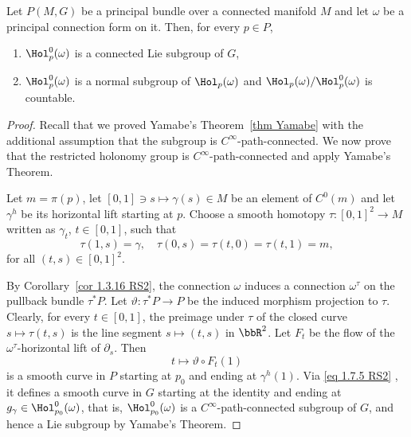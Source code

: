 \begin{thm}[{{\cite[Thm.~1.7.9]{RS2}}}]\label{thm 1.7.9 RS2}
    Let $P(M,G)$ be a principal bundle over a connected manifold $M$ and let $\omega$ be a principal connection form on it. Then, for every $p\in P$,
    \begin{enumerate}
        \item $\Hol_p^0(\omega)$ is a connected Lie subgroup of $G$,
        \item $\Hol_p^0(\omega)$ is a normal subgroup of $\Hol_p(\omega)$ and $\Hol_p(\omega)\slash \Hol_p^0(\omega)$ is countable.
    \end{enumerate}
\end{thm}
\begin{proof}
    Recall that we proved Yamabe's Theorem~\ref{thm Yamabe} with the additional assumption that the subgroup is $C^\infty$-path-connected. We now prove that the restricted holonomy group is $C^\infty$-path-connected and apply Yamabe's Theorem.

    Let $m=\pi(p)$, let $[0,1]\ni s\mapsto \gamma(s)\in M$ be an element of $C^0(m)$ and let $\gamma^h$ be its horizontal lift starting at $p$. Choose a smooth homotopy $\tau:[0,1]^2\to M$ written as $\gamma_t$, $t\in[0,1]$, such that
    \[\tau(1,s)=\gamma,\quad \tau(0,s)=\tau(t,0)=\tau(t,1)=m,\]
    for all $(t,s)\in [0,1]^2$.

    By Corollary~\ref{cor 1.3.16 RS2}, the connection $\omega$ induces a connection $\omega^\tau$ on the pullback bundle $\tau^\ast P$. Let $\vartheta:\tau^\ast P\to P$ be the induced morphism projection to $\tau$. Clearly, for every $t\in [0,1]$, the preimage under $\tau$ of the closed curve $s\mapsto \tau(t,s)$ is the line segment $s\mapsto (t,s)$ in $\bbR^2$. Let $F_t$ be the flow of the $\omega^\tau$-horizontal lift of $\partial_s$. Then
    \[t\mapsto \vartheta\circ F_t(1)\]
    is a smooth curve in $P$ starting at $p_0$ and ending at $\gamma^h(1)$. Via \eqref{eq 1.7.5 RS2} , it defines a smooth curve in $G$ starting at the identity and ending at $g_\gamma\in \Hol^0_{p_0}(\omega)$, that is, $\Hol^0_{p_0}(\omega)$ is a $C^\infty$-path-connected subgroup of $G$, and hence a Lie subgroup by Yamabe's Theorem. 


\end{proof}
